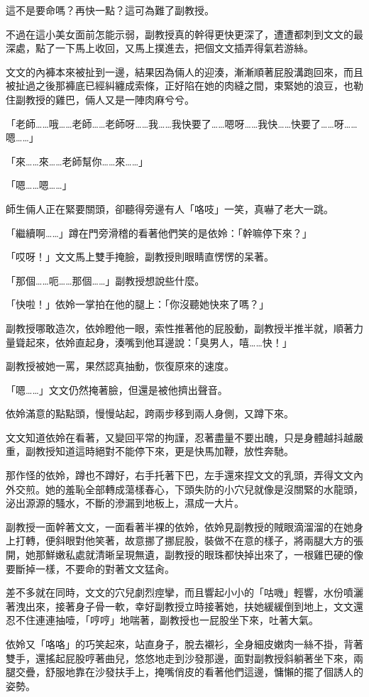 這不是要命嗎？再快一點？這可為難了副教授。

不過在這小美女面前怎能示弱，副教授真的幹得更快更深了，遭遭都刺到文文的最深處，點了一下馬上收回，又馬上撲進去，把個文文插弄得氣若游絲。

文文的內褲本來被扯到一邊，結果因為倆人的迎湊，漸漸順著屁股溝跑回來，而且被扯過之後那褲底已經糾纏成索條，正好陷在她的肉縫之間，束緊她的浪豆，也勒住副教授的雞巴，倆人又是一陣肉麻兮兮。

「老師……哦……老師……老師呀……我……我快要了……嗯呀……我快……快要了……呀……嗯……」

「來……來……老師幫你……來……」

「嗯……嗯……」

師生倆人正在緊要關頭，卻聽得旁邊有人「咯吱」一笑，真嚇了老大一跳。

「繼續啊……」蹲在門旁滑稽的看著他們笑的是依姈：「幹嘛停下來？」

「哎呀！」文文馬上雙手掩臉，副教授則眼睛直愣愣的呆著。

「那個……呃……那個……」副教授想說些什麼。

「快啦！」依姈一掌拍在他的腿上：「你沒聽她快來了嗎？」

副教授哪敢造次，依姈瞪他一眼，索性推著他的屁股動，副教授半推半就，順著力量聳起來，依姈直起身，湊嘴到他耳邊說：「臭男人，嘻……快！」

副教授被她一罵，果然認真抽動，恢復原來的速度。

「嗯……」文文仍然掩著臉，但還是被他擠出聲音。

依姈滿意的點點頭，慢慢站起，跨兩步移到兩人身側，又蹲下來。

文文知道依姈在看著，又變回平常的拘謹，忍著盡量不要出醜，只是身體越抖越嚴重，副教授知道這時絕對不能停下來，更是快馬加鞭，放性奔馳。

那作怪的依姈，蹲也不蹲好，右手托著下巴，左手還來捏文文的乳頭，弄得文文內外交煎。她的羞恥全部轉成蕩樣春心，下頭失防的小穴兒就像是沒關緊的水龍頭，泌出源源的騷水，不斷的滲漏到地板上，濕成一大片。

副教授一面幹著文文，一面看著半裸的依姈，依姈見副教授的賊眼滴溜溜的在她身上打轉，便斜眼對他笑著，故意挪了挪屁股，裝做不在意的樣子，將兩腿大方的張開，她那鮮嫩私處就清晰呈現無遺，副教授的眼珠都快掉出來了，一根雞巴硬的像要斷掉一樣，不要命的對著文文猛肏。

差不多就在同時，文文的穴兒劇烈痙攣，而且響起小小的「咕嘰」輕響，水份噴灑著洩出來，接著身子骨一軟，幸好副教授立時接著她，扶她緩緩倒到地上，文文還忍不住連連抽噎，「哼哼」地喘著，副教授也一屁股坐下來，吐著大氣。

依姈又「咯咯」的巧笑起來，站直身子，脫去襯衫，全身細皮嫩肉一絲不掛，背著雙手，還搖起屁股哼著曲兒，悠悠地走到沙發那邊，面對副教授斜躺著坐下來，兩腿交疊，舒服地靠在沙發扶手上，掩嘴俏皮的看著他們這邊，慵懶的擺了個誘人的姿勢。

